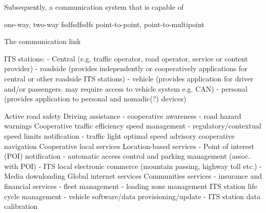 Subsequently, a communication system that is capable of 

one-way, two-way fsdfsdfsdfs
point-to-point, point-to-multipoint




The communication link 







ITS stations:
    - Central (e.g. traffic operator, road operator, service or content provider)
    - roadside (provides independently or cooperatively applications for central or other roadside ITS stations)
    - vehicle (provides application for driver and/or passengers. may require access to vehicle system e.g. CAN)
    - personal (provides application to personal and nomadic(?) devices)




 
Active road safety
    Driving assistance
        - cooperative awareness
        - road hazard warnings
Cooperative traffic efficiency
    speed management
        - regulatory/contextual speed limits notification
        - traffic light optimal speed advisory
    cooperative navigation
Cooperative local services
    Location-based services
        - Point of interest (POI) notification
        - automatic access control and parking management
        (assoc. with POI)
        - ITS local electronic commerce (mountain passing, highway toll etc.)
        - Media downloading
Global internet services
    Communities services
        - insurance and financial services
        - fleet management
        - loading zone management
    ITS station life cycle management
        - vehicle software/data provisioning/update
        - ITS station data calibration


